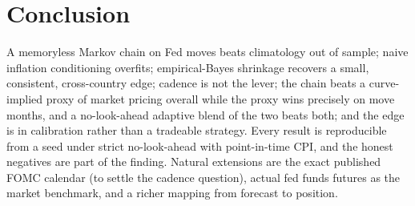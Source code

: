 \documentclass[11pt]{article}
\begin{document}
\section{Conclusion}
A memoryless Markov chain on Fed moves beats climatology out of sample; naive
inflation conditioning overfits; empirical-Bayes shrinkage recovers a small,
consistent, cross-country edge; cadence is not the lever; the chain beats a
curve-implied proxy of market pricing overall while the proxy wins precisely on
move months, and a no-look-ahead adaptive blend of the two beats both; and the
edge is in calibration rather than a tradeable strategy. Every result is
reproducible from a seed under strict no-look-ahead with point-in-time CPI, and
the honest negatives are part of the finding. Natural extensions are the exact
published FOMC calendar (to settle the cadence question), actual fed funds
futures as the market benchmark, and a richer mapping from forecast to
position.
\end{document}
